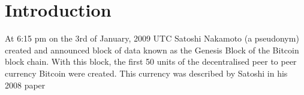 \section{Introduction}
%
%



% 
% 
% 
% 

At 6:15 pm on the 3rd of January, 2009 UTC Satoshi Nakamoto (a pseudonym)
created and announced block of data known as the Genesis Block of the Bitcoin
block chain. With this block, the first 50 units of the decentralised peer to
peer currency Bitcoin were created.  This currency was described by Satoshi in
his 2008 paper

